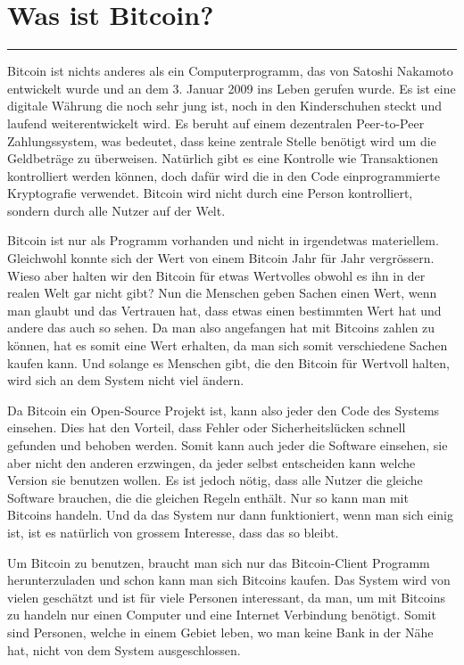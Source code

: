 \section*{Was ist Bitcoin?}
\vspace{-10mm}
\noindent\rule{0.8\textwidth}{0.4pt}

\vspace{2.5mm}
\noindent
Bitcoin ist nichts anderes als ein Computerprogramm, das von Satoshi Nakamoto entwickelt wurde und an dem 3. Januar 2009 ins Leben gerufen wurde.
Es ist eine digitale Währung die noch sehr jung ist, noch in den Kinderschuhen steckt und laufend weiterentwickelt wird.
Es beruht auf einem dezentralen Peer-to-Peer Zahlungssystem, was bedeutet, dass keine zentrale Stelle benötigt wird um die Geldbeträge zu überweisen.
Natürlich gibt es eine Kontrolle wie Transaktionen kontrolliert werden können, doch dafür wird die in den Code einprogrammierte Kryptografie verwendet.
Bitcoin wird nicht durch eine Person kontrolliert, sondern durch alle Nutzer auf der Welt.

\noindent
Bitcoin ist nur als Programm vorhanden und nicht in irgendetwas materiellem. Gleichwohl konnte sich der Wert von einem Bitcoin Jahr für Jahr vergrössern.
Wieso aber halten wir den Bitcoin für etwas Wertvolles obwohl es ihn in der realen Welt gar nicht gibt? Nun die Menschen geben Sachen einen Wert, wenn
man glaubt und das Vertrauen hat, dass etwas einen bestimmten Wert hat und andere das auch so sehen. Da man also angefangen hat mit Bitcoins zahlen zu können,
hat es somit eine Wert erhalten, da man sich somit verschiedene Sachen kaufen kann. Und solange es Menschen gibt, die den Bitcoin für Wertvoll halten, wird sich
an dem System nicht viel ändern.

\noindent
Da Bitcoin ein Open-Source Projekt ist, kann also jeder den Code des Systems einsehen. Dies hat den Vorteil, dass Fehler oder Sicherheitslücken schnell
gefunden und behoben werden. Somit kann auch jeder die Software einsehen, sie aber nicht den anderen erzwingen, da jeder selbst entscheiden kann welche
Version sie benutzen wollen. Es ist jedoch nötig, dass alle Nutzer die gleiche Software brauchen, die die gleichen Regeln enthält. Nur so kann man mit
Bitcoins handeln. Und da das System nur dann funktioniert, wenn man sich einig ist, ist es natürlich von grossem Interesse, dass das so bleibt.

\noindent
Um Bitcoin zu benutzen, braucht man sich nur das Bitcoin-Client Programm herunterzuladen und schon kann man sich Bitcoins kaufen. Das System wird von
vielen geschätzt und ist für viele Personen interessant, da man, um mit Bitcoins zu handeln nur einen Computer und eine Internet Verbindung benötigt.
Somit sind Personen, welche in einem Gebiet leben, wo man keine Bank in der Nähe hat, nicht von dem System ausgeschlossen.

